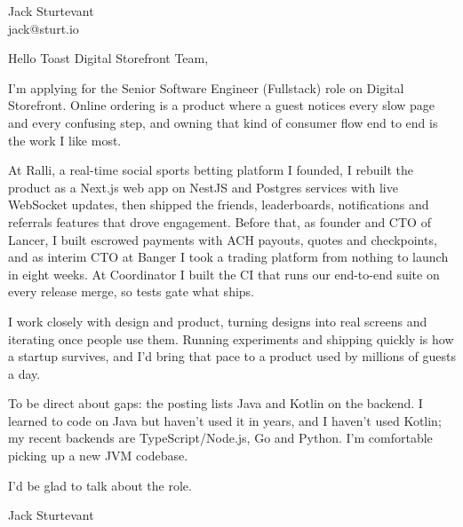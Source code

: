 \documentclass[11pt]{article}
\begin{document}
\raggedright

{\namefont\fontsize{20pt}{24pt}\selectfont Jack Sturtevant}\\[-0.3em]
jack@sturt.io

\vspace{1.2em}

Hello Toast Digital Storefront Team,

I'm applying for the Senior Software Engineer (Fullstack) role on Digital Storefront. Online ordering is a product where a guest notices every slow page and every confusing step, and owning that kind of consumer flow end to end is the work I like most.

At Ralli, a real-time social sports betting platform I founded, I rebuilt the product as a Next.js web app on NestJS and Postgres services with live WebSocket updates, then shipped the friends, leaderboards, notifications and referrals features that drove engagement. Before that, as founder and CTO of Lancer, I built escrowed payments with ACH payouts, quotes and checkpoints, and as interim CTO at Banger I took a trading platform from nothing to launch in eight weeks. At Coordinator I built the CI that runs our end-to-end suite on every release merge, so tests gate what ships.

I work closely with design and product, turning designs into real screens and iterating once people use them. Running experiments and shipping quickly is how a startup survives, and I'd bring that pace to a product used by millions of guests a day.

To be direct about gaps: the posting lists Java and Kotlin on the backend. I learned to code on Java but haven't used it in years, and I haven't used Kotlin; my recent backends are TypeScript/Node.js, Go and Python. I'm comfortable picking up a new JVM codebase.

I'd be glad to talk about the role.

\vspace{0.6em}
Jack Sturtevant
\end{document}
